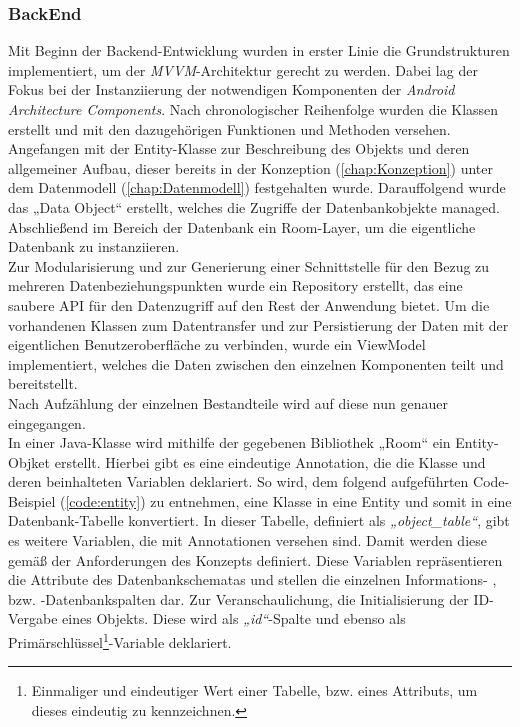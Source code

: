 \subsubsection{BackEnd}
Mit Beginn der Backend-Entwicklung wurden in erster Linie die Grundstrukturen implementiert, um der \textit{MVVM}-Architektur gerecht zu werden. Dabei lag 
der Fokus bei der Instanziierung der notwendigen Komponenten der \textit{Android Architecture Components}. Nach chronologischer Reihenfolge wurden die Klassen 
erstellt und mit den dazugehörigen Funktionen und Methoden versehen. Angefangen mit der Entity-Klasse zur Beschreibung des Objekts und deren allgemeiner Aufbau, 
dieser bereits in der Konzeption (\ref{chap:Konzeption}) unter dem Datenmodell (\ref{chap:Datenmodell}) festgehalten wurde. Darauffolgend wurde das „Data Object“ 
erstellt, welches die Zugriffe der Datenbankobjekte managed. Abschließend im Bereich der Datenbank ein Room-Layer, um die eigentliche Datenbank zu 
instanziieren. 
\\ 
Zur Modularisierung und zur Generierung einer Schnittstelle für den Bezug zu mehreren Datenbeziehungspunkten wurde ein Repository erstellt, das eine saubere 
\acs{API} für den Datenzugriff auf den Rest der Anwendung bietet. Um die vorhandenen Klassen zum Datentransfer und zur Persistierung der Daten mit der 
eigentlichen Benutzeroberfläche zu verbinden, wurde ein ViewModel implementiert, welches die Daten zwischen den einzelnen Komponenten teilt und bereitstellt. 
\\ 
\linebreak 
Nach Aufzählung der einzelnen Bestandteile wird auf diese nun genauer eingegangen. 
\\ 
\linebreak
In einer Java-Klasse wird mithilfe der gegebenen Bibliothek „Room“ ein Entity-Objket erstellt. Hierbei gibt es eine eindeutige Annotation, die die Klasse und 
deren beinhalteten Variablen deklariert. So wird, dem folgend aufgeführten Code-Beispiel (\ref{code:entity}) zu entnehmen, eine Klasse in eine Entity und somit in eine 
Datenbank-Tabelle konvertiert. In dieser Tabelle, definiert als \textit{„object\_table“}, gibt es weitere Variablen, die mit Annotationen versehen sind. Damit werden diese 
gemäß der Anforderungen des Konzepts definiert. Diese Variablen repräsentieren die Attribute des Datenbankschematas und stellen die einzelnen Informations- , bzw. 
-Datenbankspalten dar. Zur Veranschaulichung, die Initialisierung der \acs{ID}-Vergabe eines Objekts. Diese wird als \textit{„id“}-Spalte und ebenso als 
Primärschlüssel\footnote{Einmaliger und eindeutiger Wert einer Tabelle, bzw. eines Attributs, um dieses eindeutig zu kennzeichnen.}-Variable deklariert.

